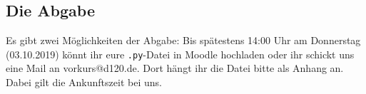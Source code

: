 \documentclass[accentcolor=tud3c,colorbacktitle,12pt]{tudexercise}
\begin{document}
	\subsection*{Die Abgabe} 
	Es gibt zwei Möglichkeiten der Abgabe: Bis spätestens 14:00 Uhr am Donnerstag (03.10.2019) könnt ihr eure \texttt{.py}-Datei in Moodle hochladen oder ihr schickt uns eine Mail an vorkurs@d120.de. Dort hängt ihr die Datei bitte als Anhang an. Dabei gilt die Ankunftszeit bei uns. 	
\end{document}
